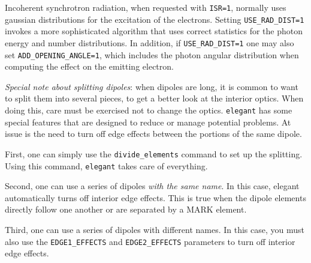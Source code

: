 Incoherent synchrotron radiation, when requested with {\tt ISR=1},
normally uses gaussian distributions for the excitation of the electrons.
Setting {\tt USE\_RAD\_DIST=1} invokes a more sophisticated algorithm that
uses correct statistics for the photon energy and number distributions.
In addition, if {\tt USE\_RAD\_DIST=1} one may also set {\tt ADD\_OPENING\_ANGLE=1},
which includes the photon angular distribution when computing the effect on 
the emitting electron.  

{\em Special note about splitting dipoles}: when dipoles are long, it is
common to want to split them into several pieces, to get a better look
at the interior optics.  When doing this, care must be exercised not
to change the optics.  {\tt elegant} has some special features that
are designed to reduce or manage potential problems. At issue is the
need to turn off edge effects between the portions of the same dipole.

First, one can simply use the \verb|divide_elements| command to set up
the splitting.  Using this command, {\tt elegant} takes care of everything.

Second, one can use a series of dipoles {\em with the same name}.  In this case,
elegant automatically turns off interior edge effects.  This is true when the
dipole elements directly follow one another or are separated by a MARK element.

Third, one can use a series of dipoles with different names.  In this case, you
must also use the \verb|EDGE1_EFFECTS| and \verb|EDGE2_EFFECTS| parameters to
turn off interior edge effects.  
